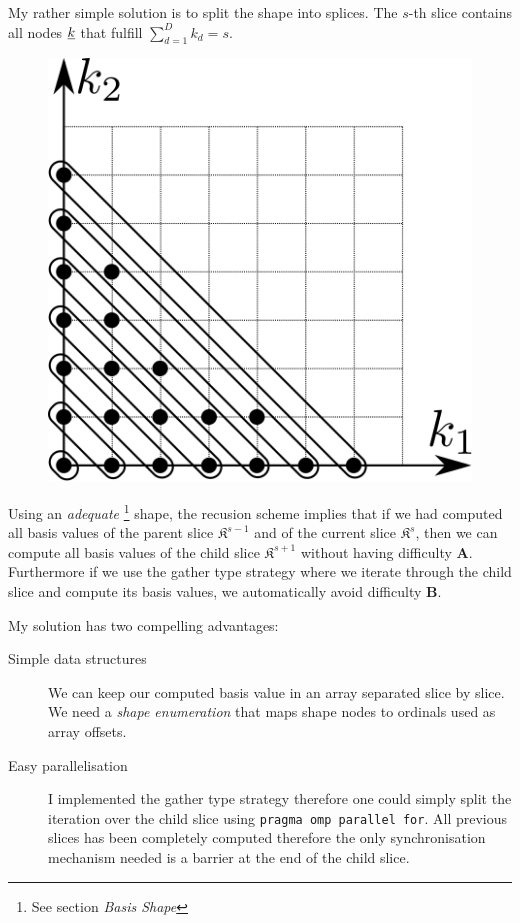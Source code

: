 \documentclass{article}
\def\code#1{\texttt{#1}}
\begin{document}
My rather simple solution is to split the shape into splices.  The
\(s\)-th slice contains all nodes \(\underline{k}\) that fulfill
\( \sum_{d=1}^{D} k_d = s \).

\begin{figure}[H]
  \begin{center}
    \includegraphics{shape_slicing}
  \end{center}
\end{figure}

Using an \emph{adequate} \footnote{See section \emph{Basis Shape}}
shape, the recusion scheme implies that if we had computed all basis
values of the parent slice \( \mathfrak{K}^{s-1} \) and of the current
slice \( \mathfrak{K}^{s} \), then we can compute all basis values of
the child slice \( \mathfrak{K}^{s+1} \) without having difficulty
\textbf{A}.  Furthermore if we use the gather type strategy where we
iterate through the child slice and compute its basis values, we
automatically avoid difficulty \textbf{B}.

My solution has two compelling advantages:
\begin{description}
\item[Simple data structures] We can keep our computed basis value in
  an array separated slice by slice. We need a \emph{shape
    enumeration} that maps shape nodes to ordinals used as array
  offsets.
\item[Easy parallelisation] I implemented the gather type strategy
  therefore one could simply split the iteration over the child slice
  using \code{pragma omp parallel for}. All previous slices has been
  completely computed therefore the only synchronisation mechanism
  needed is a barrier at the end of the child slice.
\end{description}
\end{document}
